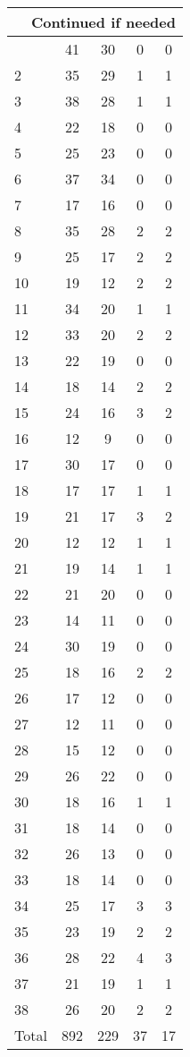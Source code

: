 \begin{center}
\begin{longtable}{l|c|c|c|c}
\hline \multicolumn{5}{|r|}{{Continued if needed}} \\ \hline
\endfoot 
1 & 41 & 30 & 0 & 0\\ \hline
2 & 35 & 29 & 1 & 1\\ \hline
3 & 38 & 28 & 1 & 1\\ \hline
4 & 22 & 18 & 0 & 0\\ \hline
5 & 25 & 23 & 0 & 0\\ \hline
6 & 37 & 34 & 0 & 0\\ \hline
7 & 17 & 16 & 0 & 0\\ \hline
8 & 35 & 28 & 2 & 2\\ \hline
9 & 25 & 17 & 2 & 2\\ \hline
10 & 19 & 12 & 2 & 2\\ \hline
11 & 34 & 20 & 1 & 1\\ \hline
12 & 33 & 20 & 2 & 2\\ \hline
13 & 22 & 19 & 0 & 0\\ \hline
14 & 18 & 14 & 2 & 2\\ \hline
15 & 24 & 16 & 3 & 2\\ \hline
16 & 12 & 9 & 0 & 0\\ \hline
17 & 30 & 17 & 0 & 0\\ \hline
18 & 17 & 17 & 1 & 1\\ \hline
19 & 21 & 17 & 3 & 2\\ \hline
20 & 12 & 12 & 1 & 1\\ \hline
21 & 19 & 14 & 1 & 1\\ \hline
22 & 21 & 20 & 0 & 0\\ \hline
23 & 14 & 11 & 0 & 0\\ \hline
24 & 30 & 19 & 0 & 0\\ \hline
25 & 18 & 16 & 2 & 2\\ \hline
26 & 17 & 12 & 0 & 0\\ \hline
27 & 12 & 11 & 0 & 0\\ \hline
28 & 15 & 12 & 0 & 0\\ \hline
29 & 26 & 22 & 0 & 0\\ \hline
30 & 18 & 16 & 1 & 1\\ \hline
31 & 18 & 14 & 0 & 0\\ \hline
32 & 26 & 13 & 0 & 0\\ \hline
33 & 18 & 14 & 0 & 0\\ \hline
34 & 25 & 17 & 3 & 3\\ \hline
35 & 23 & 19 & 2 & 2\\ \hline
36 & 28 & 22 & 4 & 3\\ \hline
37 & 21 & 19 & 1 & 1\\ \hline
38 & 26 & 20 & 2 & 2\\ \hline
\hline \hline
Total & 892 & 229 & 37 & 17



\end{longtable}
\end{center}

